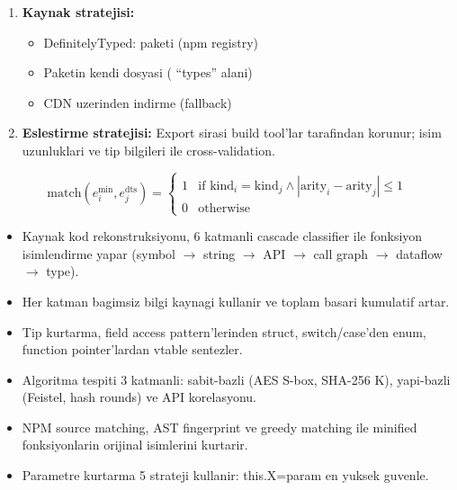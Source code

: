 \begin{enumerate}
  \item \textbf{Kaynak stratejisi:}
  \begin{itemize}
    \item DefinitelyTyped:  paketi (npm registry)
    \item Paketin kendi  dosyasi ( ``types'' alani)
    \item {} CDN uzerinden indirme (fallback)
  \end{itemize}
  \item \textbf{Eslestirme stratejisi:} Export sirasi build tool'lar tarafindan
        korunur; isim uzunluklari ve tip bilgileri ile cross-validation.
\end{enumerate}

\begin{equation}
  \text{match}(e_i^{\text{min}}, e_j^{\text{dts}}) =
  \begin{cases}
    1 & \text{if } \text{kind}_i = \text{kind}_j \wedge |\text{arity}_i - \text{arity}_j| \leq 1 \\
    0 & \text{otherwise}
  \end{cases}
  \label{eq:dts-match}
\end{equation}


\begin{ozet}
\begin{itemize}
  \item Kaynak kod rekonstruksiyonu, 6 katmanli cascade classifier ile fonksiyon
        isimlendirme yapar (symbol $\to$ string $\to$ API $\to$ call graph
        $\to$ dataflow $\to$ type).
  \item Her katman bagimsiz bilgi kaynagi kullanir ve toplam basari kumulatif artar.
  \item Tip kurtarma, field access pattern'lerinden struct, switch/case'den enum,
        function pointer'lardan vtable sentezler.
  \item Algoritma tespiti 3 katmanli: sabit-bazli (AES S-box, SHA-256 K),
        yapi-bazli (Feistel, hash rounds) ve API korelasyonu.
  \item NPM source matching, AST fingerprint ve greedy matching ile minified
        fonksiyonlarin orijinal isimlerini kurtarir.
  \item Parametre kurtarma 5 strateji kullanir: this.X=param en yuksek guvenle.
\end{itemize}
\end{ozet}


